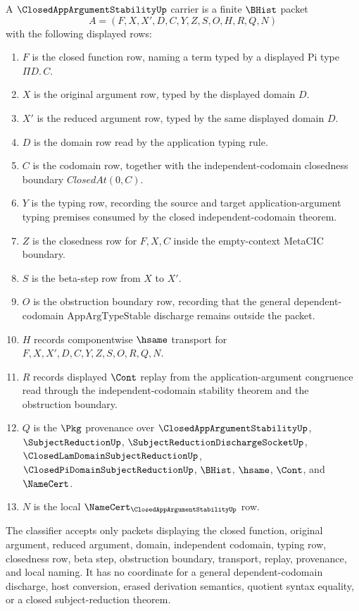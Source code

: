 \begin{definition}
\label{def:closed-app-argument-stability-carrier}
A $\ClosedAppArgumentStabilityUp$ carrier is a finite $\BHist$ packet
$$
A=(F,X,X',D,C,Y,Z,S,O,H,R,Q,N)
$$
with the following displayed rows:
\begin{enumerate}
\item $F$ is the closed function row, naming a term typed by a displayed Pi type $\Pi D.\,C$.
\item $X$ is the original argument row, typed by the displayed domain $D$.
\item $X'$ is the reduced argument row, typed by the same displayed domain $D$.
\item $D$ is the domain row read by the application typing rule.
\item $C$ is the codomain row, together with the independent-codomain closedness boundary $ClosedAt(0,C)$.
\item $Y$ is the typing row, recording the source and target application-argument typing premises consumed by the closed independent-codomain theorem.
\item $Z$ is the closedness row for $F,X,C$ inside the empty-context MetaCIC boundary.
\item $S$ is the beta-step row from $X$ to $X'$.
\item $O$ is the obstruction boundary row, recording that the general dependent-codomain $\mathrm{AppArgTypeStable}$ discharge remains outside the packet.
\item $H$ records componentwise $\hsame$ transport for $F,X,X',D,C,Y,Z,S,O,R,Q,N$.
\item $R$ records displayed $\Cont$ replay from the application-argument congruence read through the independent-codomain stability theorem and the obstruction boundary.
\item $Q$ is the $\Pkg$ provenance over $\ClosedAppArgumentStabilityUp$, $\SubjectReductionUp$, $\SubjectReductionDischargeSocketUp$, $\ClosedLamDomainSubjectReductionUp$, $\ClosedPiDomainSubjectReductionUp$, $\BHist$, $\hsame$, $\Cont$, and $\NameCert$.
\item $N$ is the local $\NameCert_{\ClosedAppArgumentStabilityUp}$ row.
\end{enumerate}
The classifier accepts only packets displaying the closed function, original argument, reduced argument, domain, independent codomain, typing row, closedness row, beta step, obstruction boundary, transport, replay, provenance, and local naming. It has no coordinate for a general dependent-codomain discharge, host conversion, erased derivation semantics, quotient syntax equality, or a closed subject-reduction theorem.
\end{definition}

